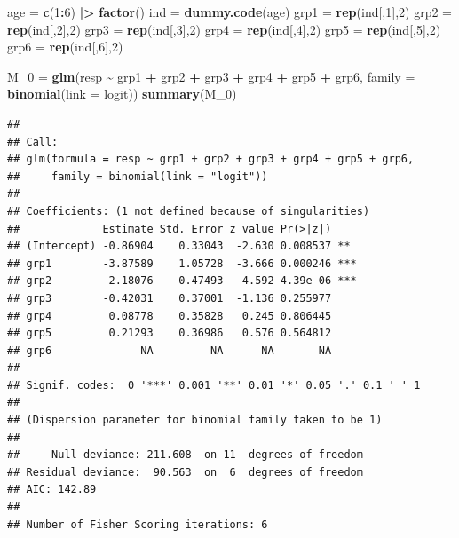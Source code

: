 \documentclass[
]{article}
\newenvironment{Shaded}{\begin{snugshade}}{\end{snugshade}}
\newcommand{\AttributeTok}[1]{\textcolor[rgb]{0.13,0.29,0.53}{#1}}
\newcommand{\DecValTok}[1]{\textcolor[rgb]{0.00,0.00,0.81}{#1}}
\newcommand{\FunctionTok}[1]{\textcolor[rgb]{0.13,0.29,0.53}{\textbf{#1}}}
\newcommand{\NormalTok}[1]{#1}
\newcommand{\OtherTok}[1]{\textcolor[rgb]{0.56,0.35,0.01}{#1}}
\newcommand{\SpecialCharTok}[1]{\textcolor[rgb]{0.81,0.36,0.00}{\textbf{#1}}}
\newcommand{\StringTok}[1]{\textcolor[rgb]{0.31,0.60,0.02}{#1}}
\begin{document}
\begin{Shaded}
\begin{Highlighting}[]
\NormalTok{age }\OtherTok{=} \FunctionTok{c}\NormalTok{(}\DecValTok{1}\SpecialCharTok{:}\DecValTok{6}\NormalTok{) }\SpecialCharTok{|\textgreater{}} 
  \FunctionTok{factor}\NormalTok{()}
\NormalTok{ind }\OtherTok{=} \FunctionTok{dummy.code}\NormalTok{(age)}
\NormalTok{grp1 }\OtherTok{=} \FunctionTok{rep}\NormalTok{(ind[,}\DecValTok{1}\NormalTok{],}\DecValTok{2}\NormalTok{)}
\NormalTok{grp2 }\OtherTok{=} \FunctionTok{rep}\NormalTok{(ind[,}\DecValTok{2}\NormalTok{],}\DecValTok{2}\NormalTok{)}
\NormalTok{grp3 }\OtherTok{=} \FunctionTok{rep}\NormalTok{(ind[,}\DecValTok{3}\NormalTok{],}\DecValTok{2}\NormalTok{)}
\NormalTok{grp4 }\OtherTok{=} \FunctionTok{rep}\NormalTok{(ind[,}\DecValTok{4}\NormalTok{],}\DecValTok{2}\NormalTok{)}
\NormalTok{grp5 }\OtherTok{=} \FunctionTok{rep}\NormalTok{(ind[,}\DecValTok{5}\NormalTok{],}\DecValTok{2}\NormalTok{)}
\NormalTok{grp6 }\OtherTok{=} \FunctionTok{rep}\NormalTok{(ind[,}\DecValTok{6}\NormalTok{],}\DecValTok{2}\NormalTok{)}

\NormalTok{M\_0 }\OtherTok{=} \FunctionTok{glm}\NormalTok{(resp }\SpecialCharTok{\textasciitilde{}}\NormalTok{ grp1 }\SpecialCharTok{+}\NormalTok{ grp2 }\SpecialCharTok{+}\NormalTok{ grp3 }\SpecialCharTok{+}\NormalTok{ grp4 }\SpecialCharTok{+}\NormalTok{ grp5 }\SpecialCharTok{+}\NormalTok{ grp6, }\AttributeTok{family =} \FunctionTok{binomial}\NormalTok{(}\AttributeTok{link =} \StringTok{\textquotesingle{}logit\textquotesingle{}}\NormalTok{))}
\FunctionTok{summary}\NormalTok{(M\_0)}
\end{Highlighting}
\end{Shaded}

\begin{verbatim}
## 
## Call:
## glm(formula = resp ~ grp1 + grp2 + grp3 + grp4 + grp5 + grp6, 
##     family = binomial(link = "logit"))
## 
## Coefficients: (1 not defined because of singularities)
##             Estimate Std. Error z value Pr(>|z|)    
## (Intercept) -0.86904    0.33043  -2.630 0.008537 ** 
## grp1        -3.87589    1.05728  -3.666 0.000246 ***
## grp2        -2.18076    0.47493  -4.592 4.39e-06 ***
## grp3        -0.42031    0.37001  -1.136 0.255977    
## grp4         0.08778    0.35828   0.245 0.806445    
## grp5         0.21293    0.36986   0.576 0.564812    
## grp6              NA         NA      NA       NA    
## ---
## Signif. codes:  0 '***' 0.001 '**' 0.01 '*' 0.05 '.' 0.1 ' ' 1
## 
## (Dispersion parameter for binomial family taken to be 1)
## 
##     Null deviance: 211.608  on 11  degrees of freedom
## Residual deviance:  90.563  on  6  degrees of freedom
## AIC: 142.89
## 
## Number of Fisher Scoring iterations: 6
\end{verbatim}
\end{document}
